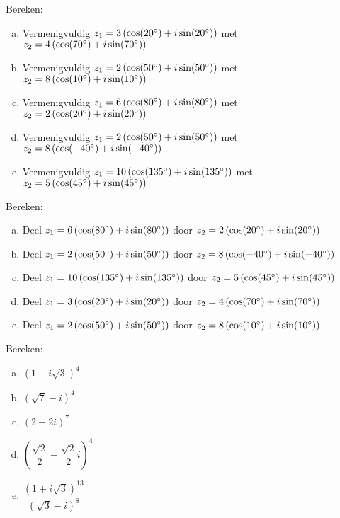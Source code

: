 \documentclass[12pt,twoside]{article}
\begin{document}
\begin{oefening}
Bereken:
\begin{enumerate}[(a)]
  \itemsep.5em
  \item Vermenigvuldig $z_1=3\left(\cos(20^\circ)+i\sin(20^\circ)\right)$ met $z_2=4\left(\cos(70^\circ)+i\sin(70^\circ)\right)$
  \item Vermenigvuldig $z_1=2\left(\cos(50^\circ)+i\sin(50^\circ)\right)$ met $z_2=8\left(\cos(10^\circ)+i\sin(10^\circ)\right)$
  \item Vermenigvuldig $z_1=6\left(\cos(80^\circ)+i\sin(80^\circ)\right)$ met $z_2=2\left(\cos(20^\circ)+i\sin(20^\circ)\right)$
  \item Vermenigvuldig $z_1=2\left(\cos(50^\circ)+i\sin(50^\circ)\right)$ met $z_2=8\left(\cos(-40^\circ)+i\sin(-40^\circ)\right)$
  \item Vermenigvuldig $z_1=10\left(\cos(135^\circ)+i\sin(135^\circ)\right)$ met $z_2=5\left(\cos(45^\circ)+i\sin(45^\circ)\right)$
\end{enumerate}
\end{oefening}

\begin{oefening}
Bereken:
\begin{enumerate}[(a)]
  \itemsep.5em
  \item Deel $z_1=6\left(\cos(80^\circ)+i\sin(80^\circ)\right)$ door $z_2=2\left(\cos(20^\circ)+i\sin(20^\circ)\right)$
  \item Deel $z_1=2\left(\cos(50^\circ)+i\sin(50^\circ)\right)$ door $z_2=8\left(\cos(-40^\circ)+i\sin(-40^\circ)\right)$
  \item Deel $z_1=10\left(\cos(135^\circ)+i\sin(135^\circ)\right)$ door $z_2=5\left(\cos(45^\circ)+i\sin(45^\circ)\right)$
  \item Deel $z_1=3\left(\cos(20^\circ)+i\sin(20^\circ)\right)$ door $z_2=4\left(\cos(70^\circ)+i\sin(70^\circ)\right)$
  \item Deel $z_1=2\left(\cos(50^\circ)+i\sin(50^\circ)\right)$ door $z_2=8\left(\cos(10^\circ)+i\sin(10^\circ)\right)$
\end{enumerate}
\end{oefening}

\begin{oefening}
Bereken:
\begin{enumerate}[(a)]
  \itemsep.5em
  \item $\displaystyle \left(1+i\sqrt{3}\right)^4$
  \item $\displaystyle \left(\sqrt{7}-i\right)^4$
  \item $\displaystyle \left(2-2i\right)^7$
  \item $\displaystyle \left(\dfrac{\sqrt{2}}{2}-\dfrac{\sqrt{2}}{2}i\right)^4$
  \item $\displaystyle \dfrac{\left(1+i\sqrt{3}\right)^{13}}{\left(\sqrt{3}-i\right)^8}$
\end{enumerate}
\end{oefening}
\end{document}
